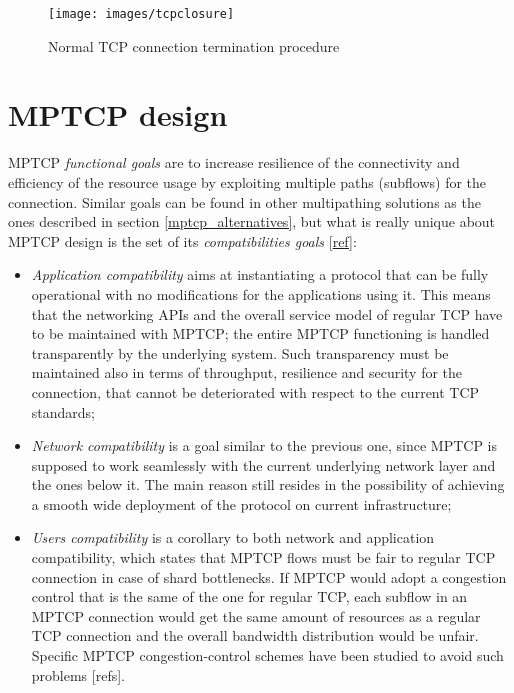 \begin{figure}[!htb]
\centering
\texttt{[image: images/tcpclosure]}
\caption{Normal TCP connection termination procedure}
\label{fig:tcpclosure}
\end{figure}

\section{MPTCP design}
\label{mptcpdesign}
MPTCP \textit{functional goals} are to increase resilience of the connectivity and efficiency of the resource usage by exploiting multiple paths (subflows) for the connection.
Similar goals can be found in other multipathing solutions as the ones described in section \ref{mptcp_alternatives}, but what is really unique about MPTCP design is the set of its \textit{compatibilities goals} [\href{https://tools.ietf.org/html/rfc6182}{ref}]:

\begin{itemize}
  \item \textit{Application compatibility} aims at instantiating a protocol that can be fully operational with no modifications for the applications using it. This means that the networking APIs and the overall service model of regular TCP have to be maintained with MPTCP; the entire MPTCP functioning is handled transparently by the underlying system. Such transparency must be maintained also in terms of throughput, resilience and security for the connection, that cannot be deteriorated with respect to the current TCP standards;
  \item \textit{Network compatibility} is a goal similar to the previous one, since MPTCP is supposed to work seamlessly with the current underlying network layer and the ones below it. The main reason still resides in the possibility of achieving a smooth wide deployment of the protocol on current infrastructure;
  \item \textit{Users compatibility} is a corollary to both network and application compatibility, which states that MPTCP flows must be fair to regular TCP connection in case of shard bottlenecks. If MPTCP would adopt a congestion control that is the same of the one for regular TCP, each subflow in an MPTCP connection would get the same amount of resources as a regular TCP connection and the overall bandwidth distribution would be unfair. Specific MPTCP congestion-control schemes have been studied to avoid such problems [refs].
\end{itemize}

